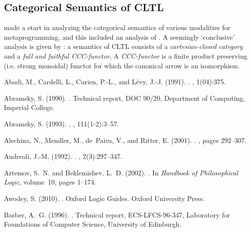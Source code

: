 \documentclass[a4paper]{amsart}
\begin{document}
\subsection{Categorical Semantics of \textsf{CLTL}}

\cite{Benaissa1998a} made a start in analyzing the categorical
semantics of various modalities for metaprogramming, and this
included an analysis of . A seemingly
`conclusive' analysis is given by \cite{Benaissa1999}: a semantics
of \textsf{CLTL} consists of a \emph{cartesian-closed category}
 and a \emph{full and faithful CCC-functor},  A \emph{CCC-functor} is a finite product preserving (i.e.
strong monoidal) functor for which the canonical arrow  is an isomorphism.

\begin{thebibliography}{}

Abadi, M., Cardelli, L., Curien, P.-L., and L{\'{e}}vy, J.-J. (1991).
.
, 1(04):375.

Abramsky, S. (1990).
.
\newblock Technical report, DOC 90/20, Department of Computing, Imperial
  College.

Abramsky, S. (1993).
.
, 111(1-2):3--57.

Alechina, N., Mendler, M., de~Paiva, V., and Ritter, E. (2001).
.
, pages 292--307.

Andreoli, J.-M. (1992).
.
, 2(3):297--347.

Artemov, S.~N. and Beklemishev, L.~D. (2002).
.
\newblock In {\em Handbook of Philosophical Logic}, volume~10, pages 1--174.

Awodey, S. (2010).
.
\newblock Oxford Logic Guides. Oxford University Press.

Barber, A.~G. (1996).
.
\newblock Technical report, ECS-LFCS-96-347, Laboratory for Foundations of
  Computer Science, University of Edinburgh.


\end{thebibliography}
\end{document}
